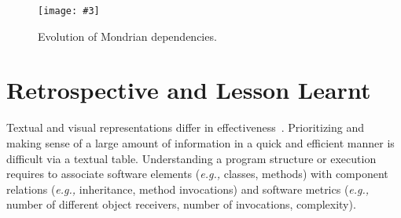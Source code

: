 \documentclass[runningheads]{llncs}
\newcommand{\ct}{\lstinline[backgroundcolor=\color{white},basicstyle=\footnotesize\ttfamily]}
\newcommand{\sd}[1]{\nb{SD}{orange}{#1}}
\newcommand{\largefig}[4]{
	\begin{figure*}[#1]
		\centering
		\texttt{[image: \#3]}
		\caption{\label{fig:#3}#4}
	\end{figure*}}
\newcommand{\eg}{\emph{e.g.,}\xspace}
\newcommand{\seclabel}[1]{\label{sec:#1}}
\newcommand{\figref}[1]{Figure~\ref{fig:#1}}
\begin{document}
%
%
%
%
%
%

\largefig{}{1.23}{DependencyBlueprint}{Evolution of Mondrian dependencies.}

\section{Retrospective and Lesson Learnt} \seclabel{lessonLearnt}

Textual and visual representations differ in effectiveness~\cite{Petr95a}. 
Prioritizing and making sense of a large amount of information in a quick and efficient manner is difficult via a textual table. Understanding a program structure or execution requires to associate software elements (\eg classes, methods) with component relations (\eg inheritance, method invocations) and software metrics (\eg number of different object receivers, number of invocations, complexity). 
\end{document}
